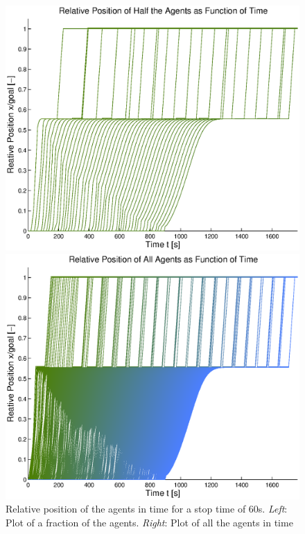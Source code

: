 \documentclass[11pt]{article}
\begin{document}
\begin{figure}
 	\begin{minipage}{0.48\textwidth}
		\includegraphics[width = \textwidth]{Images/RESULTS01_Stop60/PositionFracAgents.eps}
 	 \end{minipage}
  	\hfill
  	\begin{minipage}{0.48\textwidth}
   		 \includegraphics[width = \textwidth]{Images/RESULTS01_Stop60/PositionAllAgents.eps}
  	\end{minipage}
  	\caption{Relative position of the agents in time for a stop time of 60s. \emph{Left}: Plot of a fraction of the agents. \emph{Right}: Plot of all the agents in time}
  	\label{img:stopTime60Agents}
\end{figure}
\end{document}
